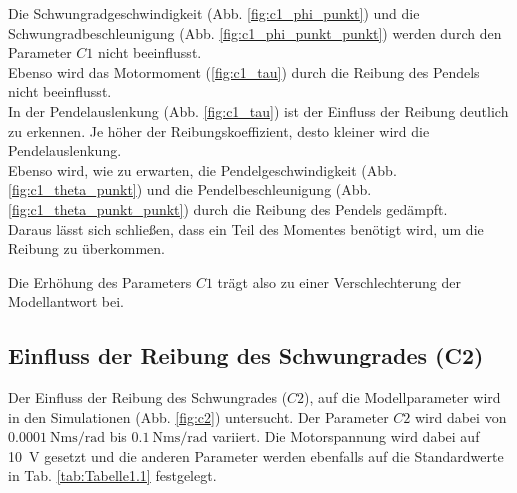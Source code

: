 Die Schwungradgeschwindigkeit (Abb. \ref{fig:c1_phi_punkt}) und die Schwungradbeschleunigung (Abb. \ref{fig:c1_phi_punkt_punkt}) werden durch den Parameter $C1$ nicht beeinflusst.\\
Ebenso wird das Motormoment (\ref{fig:c1_tau}) durch die Reibung des Pendels nicht beeinflusst.\\

In der Pendelauslenkung (Abb. \ref{fig:c1_tau}) ist der Einfluss der Reibung deutlich zu erkennen. Je höher der Reibungskoeffizient, desto kleiner wird die Pendelauslenkung.\\
Ebenso wird, wie zu erwarten, die Pendelgeschwindigkeit (Abb. \ref{fig:c1_theta_punkt}) und die Pendelbeschleunigung (Abb. \ref{fig:c1_theta_punkt_punkt}) durch die Reibung des Pendels gedämpft.\\
Daraus lässt sich schließen, dass ein Teil des Momentes benötigt wird, um die Reibung zu überkommen. 

Die Erhöhung des Parameters $C1$ trägt also zu einer Verschlechterung der Modellantwort bei.
\subsection*{Einfluss der Reibung des Schwungrades (C2)}
Der Einfluss der Reibung des Schwungrades ($C2$), auf die Modellparameter wird in den Simulationen (Abb. \ref{fig:c2}) untersucht. 
Der Parameter $C2$ wird dabei von $\SI{0.0001}{\newton\meter\second\per\radian}$ bis $\SI{0.1}{\newton\meter\second\per\radian}$ variiert.
Die Motorspannung wird dabei auf \SI{10}{\volt} gesetzt und die anderen Parameter werden ebenfalls auf die Standardwerte in Tab. \ref{tab:Tabelle1.1} festgelegt.\\
 
